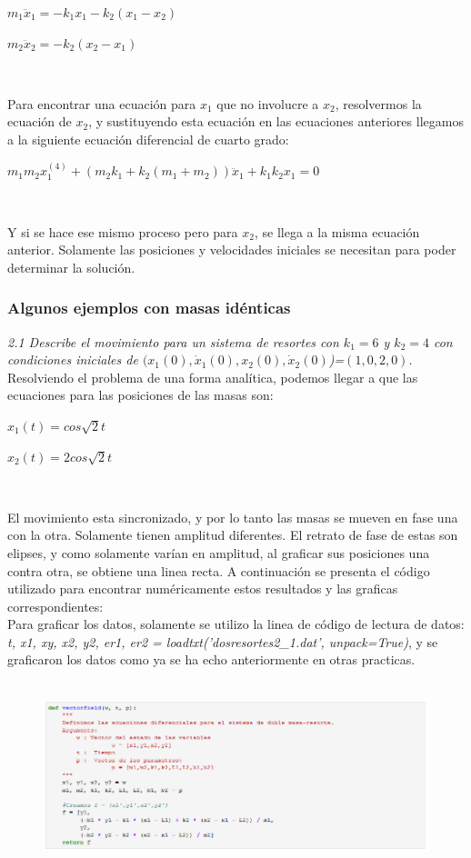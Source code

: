 \documentclass[12pt]{article}
\begin{document}
\centerline{$m_1 \ddot x_1 = -k_1x_1 - k_2(x_1-x_2)$}
\centerline{$m_2 \ddot x_2 = -k_2(x_2-x_1)$}
$    $

Para encontrar una ecuación para $x_1$ que no involucre a $x_2$, resolvermos la ecuación de $x_2$, y sustituyendo esta ecuación en las ecuaciones anteriores llegamos a la siguiente ecuación diferencial de cuarto grado: \\

\centerline{$m_1m_2x_1^{(4)} + (m_2k_1 + k_2(m_1+m_2)) \ddot x_1 + k_1k_2x_1=0$}
$    $

Y si se hace ese mismo proceso pero para $x_2$, se llega a la misma ecuación anterior. Solamente las posiciones y velocidades iniciales se necesitan para poder determinar la solución. 

\subsubsection{Algunos ejemplos con masas idénticas}
\noindent \textit{2.1 Describe el movimiento para un sistema de resortes con $k_1=6$ y $k_2=4$ con condiciones iniciales de $(x_1(0), \dot x_1(0), x_2(0), \dot x_2(0)$)=$(1,0,2,0)$.}\\

Resolviendo el problema de una forma analítica, podemos llegar a que las ecuaciones para las posiciones de las masas son: \\

\centerline{$x_1(t) = cos \sqrt 2 t$}
\centerline{$x_2(t) = 2 cos \sqrt 2 t$}
$ $

El movimiento esta sincronizado, y por lo tanto las masas se mueven en fase una con la otra. Solamente tienen amplitud diferentes. El retrato de fase de estas son elipses, y como solamente varían en amplitud, al graficar sus posiciones una contra otra, se obtiene una linea recta. A continuación se presenta el código utilizado para encontrar numéricamente estos resultados y las graficas correspondientes: \\ 

Para graficar los datos, solamente se utilizo la linea de código de lectura de datos: \textit{t, x1, xy, x2, y2, er1, er2 = loadtxt('dosresortes2\_1.dat', unpack=True)}, y se graficaron los datos como ya se ha echo anteriormente en otras practicas. \\ \\  

\begin{figure}[h!]
    \centering
\includegraphics[width=6in]{Cod1.png}
\end{figure}
\end{document}
